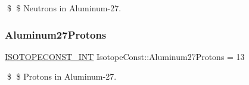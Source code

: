 \$ \$ Neutrons in Aluminum-\/27. \mbox{\label{group___isotope_const-_aluminum-_al27_gabac87c2736616b008bdb04b44e209bfa}} 
\subsubsection{\texorpdfstring{Aluminum27\+Protons}{Aluminum27Protons}}
{\footnotesize\ttfamily \mbox{\hyperlink{group___isotope_const-_macros_ga5f18360b3e99483a35c32d789e62621c}{I\+S\+O\+T\+O\+P\+E\+C\+O\+N\+S\+T\+\_\+\+I\+NT}} Isotope\+Const\+::\+Aluminum27\+Protons = 13}

\$ \$ Protons in Aluminum-\/27. 
